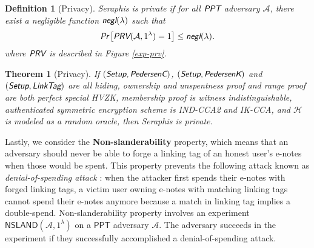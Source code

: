\documentclass{article}
\newtheorem{definition}{Definition}[section]
\newtheorem{theorem}{Theorem}[section]
\begin{document}
\begin{definition}[Privacy]
Seraphis is private if for all $\emph{\textsf{PPT}}$ adversary $\mathcal{A}$, there exist a negligible function $\emph{\textsf{negl}}(\lambda)$ such that
\begin{align*}
\emph{\textsf{Pr}}
\left[
\emph{\textsf{PRV}}(\mathcal{A}, 1^{\lambda})=1
\right]
\le \emph{\textsf{negl}}(\lambda).
\end{align*}
where $\emph{\textsf{PRV}}$ is described in Figure \ref{exp-prv}.
\end{definition}
\begin{theorem}[Privacy]\label{thm-prv}
If $(\emph{\textsf{Setup}},\emph{\textsf{PedersenC}})$, $(\emph{\textsf{Setup}},\emph{\textsf{PedersenK}})$ and $(\emph{\textsf{Setup}},\emph{\textsf{LinkTag}})$ are all hiding, ownership and unspentness proof and range proof are both perfect special HVZK, membership proof is witness indistinguishable, authenticated symmetric encryption scheme is IND-CCA2 and IK-CCA, and $\mathcal{H}$ is modeled as a random oracle, then Seraphis is private.  
\end{theorem}

Lastly, we consider the \textbf{Non-slanderability} property, which means that an adversary should never be able to forge a linking tag of an honest user's e-notes when those would be spent. This property prevents the following attack known as \textit{denial-of-spending attack} \cite{denial-of-spend}: when the attacker first spends their e-notes with forged linking tags, a victim user owning e-notes with matching linking tags cannot spend their e-notes anymore because a match in linking tag implies a double-spend. Non-slanderability property involves an experiment $\textsf{NSLAND}(\mathcal{A}, 1^{\lambda})$ on a $\textsf{PPT}$ adversary $\mathcal{A}$. The adversary succeeds in the experiment if they successfully accomplished a denial-of-spending attack.
\end{document}

